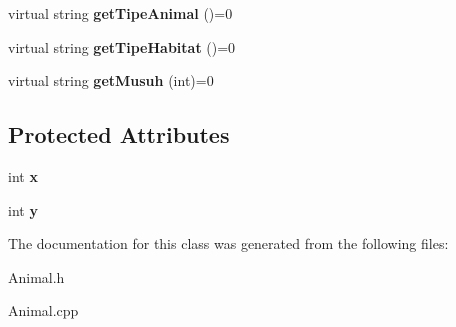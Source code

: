 \begin{DoxyCompactItemize}
\item 
\hypertarget{classAnimal_a0a4dd28bae4de877623c581c4161a5e9}{virtual string {\bfseries get\-Tipe\-Animal} ()=0}\label{classAnimal_a0a4dd28bae4de877623c581c4161a5e9}

\item 
\hypertarget{classAnimal_a3f11826febbaf0b08f3f1f75b2bdc45b}{virtual string {\bfseries get\-Tipe\-Habitat} ()=0}\label{classAnimal_a3f11826febbaf0b08f3f1f75b2bdc45b}

\item 
\hypertarget{classAnimal_a373691a5a672aaf7d2b4fd4dcd8f1288}{virtual string {\bfseries get\-Musuh} (int)=0}\label{classAnimal_a373691a5a672aaf7d2b4fd4dcd8f1288}

\end{DoxyCompactItemize}
\subsection*{Protected Attributes}
\begin{DoxyCompactItemize}
\item 
\hypertarget{classAnimal_a7bf0bfeda35cb1d9737709e9acfb5bfb}{int {\bfseries x}}\label{classAnimal_a7bf0bfeda35cb1d9737709e9acfb5bfb}

\item 
\hypertarget{classAnimal_aecc19a45f1ab7e99a4507938f23a02da}{int {\bfseries y}}\label{classAnimal_aecc19a45f1ab7e99a4507938f23a02da}

\end{DoxyCompactItemize}


The documentation for this class was generated from the following files\-:\begin{DoxyCompactItemize}
\item 
Animal.\-h\item 
Animal.\-cpp\end{DoxyCompactItemize}
